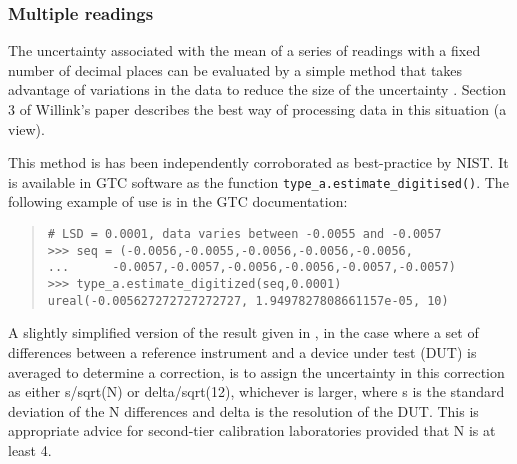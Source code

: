 \subsubsection{Multiple readings}
The uncertainty associated with the mean of a series of readings with a fixed number of decimal places can be evaluated by a simple method that takes advantage of variations in the data to reduce the size of the uncertainty \cite{WILLINK_07}. Section 3 of Willink's paper describes the best way of processing data in this situation (a view).
 
This method is has been independently corroborated as best-practice by NIST.  It is available in GTC software as the function \verb|type_a.estimate_digitised()|.   The following example of use is in the GTC documentation:
\begin{quote}
\begin{verbatim}
# LSD = 0.0001, data varies between -0.0055 and -0.0057
>>> seq = (-0.0056,-0.0055,-0.0056,-0.0056,-0.0056, 
...      -0.0057,-0.0057,-0.0056,-0.0056,-0.0057,-0.0057)
>>> type_a.estimate_digitized(seq,0.0001)
ureal(-0.005627272727272727, 1.9497827808661157e-05, 10)
\end{verbatim}
\end{quote}

A slightly simplified version of the result given in \cite{WILLINK_07}, in the case where a set of differences between a reference instrument and a device under test (DUT) is averaged to determine a correction, is to assign the uncertainty in this correction as either s/sqrt(N) or delta/sqrt(12), whichever is larger, where s is the standard deviation of the N differences and delta is the resolution of the DUT. This is appropriate advice for second-tier calibration laboratories provided that N is at least 4.
